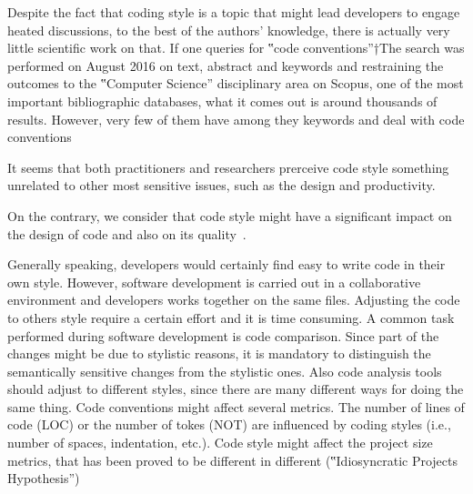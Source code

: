 Despite the fact that coding style is a topic that might lead developers to
engage heated discussions, to the best of the authors' knowledge, there is
actually very little scientific work on that. If one queries for ‟code
conventions”†{The search was performed on August 2016 on text, abstract and
keywords and restraining the outcomes to the ‟Computer Science” disciplinary
area} on Scopus, one of the most important
bibliographic databases, what it comes out is around thousands of results.
However, very few of them have  among they keywords and
deal with code conventions

It seems that both practitioners and researchers prerceive code style something unrelated to other most
sensitive issues, such as the design and productivity.

On the contrary, we consider that code style might have a significant impact on the
design of code and also on its quality~\cite{Gil:2010}.

Generally speaking, developers would certainly find easy to write code in their own style.
However, software development is carried out in a collaborative environment and developers
works together on the same files. Adjusting the code to others style require a certain effort
and it is time consuming. A common task performed during software development is code comparison.
Since part of the changes might be due to stylistic reasons, it is mandatory to distinguish the
semantically sensitive changes from the stylistic ones.
Also code analysis tools should adjust to different styles, since there are many
different ways for doing the same thing.
Code conventions might affect several metrics. The number of lines of code
(LOC) or the number of tokes (NOT) are influenced by coding styles (i.e.,
number of spaces, indentation, etc.). Code style might affect the project size
metrics, that has been proved to be different in different (‟Idiosyncratic
Projects
Hypothesis”)~\cite{Gil:Lalouche:16}~\cite{Gil:2011:Goldstein:Moshkovich:2011}

